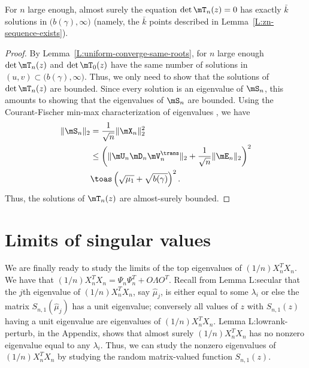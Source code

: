 \begin{lemma}
    For $n$ large enough, almost surely
    the equation $\det \mT_n(z) = 0$ has exactly 
    $\bar k$ solutions in  $\big( b(\gamma), \infty \big)$
    (namely, the $\bar k$  points described in 
    Lemma~\ref{L:zn-sequence-exists}).
\end{lemma}
\begin{proof}
    By Lemma~\ref{L:uniform-converge-same-roots}, for $n$ large enough
    $\det \mT_n(z)$ and $\det \mT_0(z)$ have the same number of solutions in 
    $(u,v) \subset \big( b(\gamma), \infty \big)$.  Thus, we only need to
    show that the solutions of $\det \mT_n(z)$ are bounded.  Since every
    solution is an eigenvalue of $\mS_n$, this amounts to showing that the
    eigenvalues of $\mS_n$ are bounded.  Using the Courant-Fischer 
    min-max characterization of eigenvalues \cite{golub1996mc}, we have
    \begin{align*}
        \| \mS_n \|_2
            &= \frac{1}{\sqrt{n}} \| \mX_n \|_2^2 \\
            &\leq 
                \left(
                    \| \mU_n \mD_n \mV_n^\trans \|_2
                    +
                    \frac{1}{\sqrt{n}}
                    \| \mE_n \|_2
                \right)^2 \\
            &\toas
                \left( \sqrt{\mu_1} + \sqrt{b(\gamma)} \right)^2.
    \end{align*}
    Thus, the solutions of $\mT_n(z)$ are almost-surely bounded.
\end{proof}



\clearpage


\section{Limits of singular values}

We are finally ready to study the limits of the top eigenvalues of
$(1/n) X_n^T X_n$.  We have that
$(1/n) X_n^T X_n = \Psi_n \Psi_n^T + O \Lambda O^T$. Recall from
Lemma {L:secular} that the $j$th eigenvalue of $(1/n) X_n^T X_n$, say 
$\hat \mu_j$, is either equal to some $\lambda_i$ or else the matrix
$S_{n,1}(\hat \mu_j)$ has a unit eigenvalue; conversely all values of $z$ with
$S_{n,1}(z)$ having a unit eigenvalue are eigenvalues of $(1/n) X_n^T X_n$.
Lemma {L:lowrank-perturb}, in the Appendix, shows that  almost surely
$(1/n) X_n^T X_n$ has no nonzero eigenvalue equal to any $\lambda_i$.  Thus,
we can study the nonzero eigenvalues of $(1/n) X_n^T X_n$ by studying the
random matrix-valued function $S_{n,1}(z)$.

